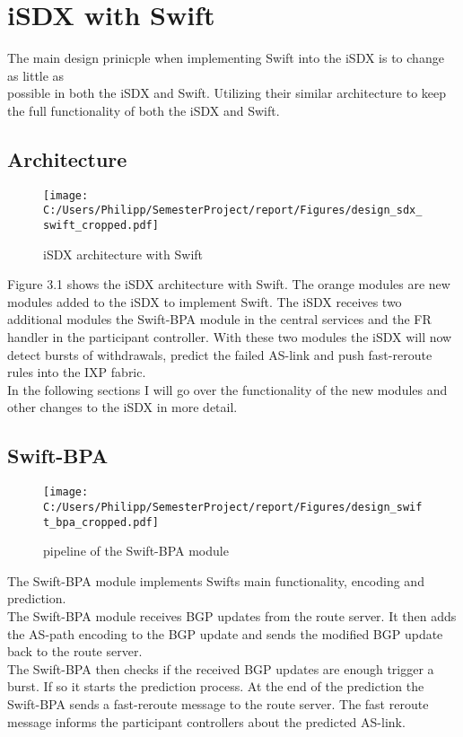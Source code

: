\chapter{\label{chapter3}iSDX with Swift}

The main design prinicple when implementing Swift into the iSDX is to change as little as \\ 
possible in both the iSDX and Swift. Utilizing their similar architecture to keep the full functionality of both the iSDX and Swift.

\section{\label{chapter3:Architecture}Architecture}

\begin{figure}[h]
\center
\texttt{[image: C:/Users/Philipp/SemesterProject/report/Figures/design\_sdx\_swift\_cropped.pdf]}
\caption{iSDX architecture with Swift}
\end{figure}

Figure 3.1 shows the iSDX architecture with Swift. The orange modules are new modules added to the iSDX to implement Swift. The iSDX receives two additional modules the Swift-BPA module in the central services and the FR handler in the participant controller. With these two modules the iSDX will now detect bursts of withdrawals, predict the failed AS-link and push fast-reroute rules into the IXP fabric. \\
In the following sections I will go over the functionality of the new modules and other changes to the iSDX in more detail.

\section{\label{chapter3:Swift-BPA}Swift-BPA}

\begin{figure}[h]
\center
\texttt{[image: C:/Users/Philipp/SemesterProject/report/Figures/design\_swift\_bpa\_cropped.pdf]}
\caption{pipeline of the Swift-BPA module}
\end{figure}

The Swift-BPA module implements Swifts main functionality, encoding and prediction. \\
The Swift-BPA module receives BGP updates from the route server. It then adds the AS-path encoding to the BGP update and sends the modified BGP update back to the route server. \\
The Swift-BPA then checks if the received BGP updates are enough trigger a burst. If so it starts the prediction process. At the end of the prediction the Swift-BPA sends a fast-reroute message to the route server. The fast reroute message informs the participant controllers about the predicted AS-link. \\
 


